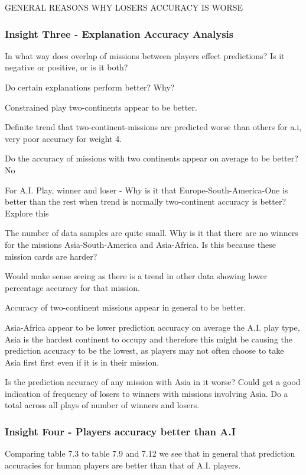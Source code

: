\documentclass[parskip]{cs4rep}
\begin{document}
GENERAL REASONS WHY LOSERS ACCURACY IS WORSE

\subsubsection{Insight Three - Explanation Accuracy Analysis}

In what way does overlap of missions between players effect predictions? Is it negative or positive, or is it both?

Do certain explanations perform better? Why?

Constrained play two-continents appear to be better.

Definite trend that two-continent-missions are predicted worse than others for a.i, very poor accuracy for weight 4.
 
Do the accuracy of missions with two continents appear on average to be better? No

For A.I. Play, winner and loser - Why is it that Europe-South-America-One is better than the rest when trend is normally two-continent accuracy is better? Explore this

The number of data samples are quite small.	Why is it that there are no winners for the missions Asia-South-America and Asia-Africa. Is this because these mission cards are harder?

Would make sense seeing as there is a trend in other data showing lower percentage accuracy for that mission.

Accuracy of two-continent missions appear in general to be better.

Asia-Africa appear to be lower prediction accuracy on average the A.I. play type, Asia is the hardest continent to occupy and therefore this might be causing the prediction accuracy to be the lowest, as players may not often choose to take Asia first first even if it is in their mission.

Is the prediction accuracy of any mission with Asia in it worse? Could get a good indication of frequency of losers to winners with missions involving Asia. Do a total across all plays of number of winners and losers.

\subsubsection{Insight Four - Players accuracy better than A.I}

Comparing table 7.3 to table 7.9 and 7.12 we see that in general that prediction accuracies for human players are better than that of A.I. players.
\end{document}
